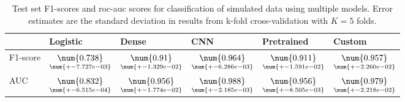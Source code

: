 \begin{table}
\centering
\caption{
Test set F1-scores and roc-auc scores for classification of simulated data using multiple models. 
Error estimates are the standard deviation in results from k-fold cross-validation 
with $K=5$ folds.
}
\label{tab:classification-simulated-f1-auc}
\begin{tabular}{llllll}
\toprule
{} &                                            Logistic &                                               Dense &                                                 CNN &                                          Pretrained &                                              Custom \\
\midrule
F1-score &  $\underset{\num{+- 7.727e-03 }  }{\num{ 0.738 } }$ &  $\underset{\num{+- 1.329e-02 }  }{\num{ 0.91 } }$ &  $\underset{\num{+- 6.286e-03 }  }{\num{ 0.964 } }$ &  $\underset{\num{+- 1.591e-02 }  }{\num{ 0.911 } }$ &  $\underset{\num{+- 2.260e-02 }  }{\num{ 0.957 } }$ \\
AUC      &  $\underset{\num{+- 6.515e-04 }  }{\num{ 0.832 } }$ &  $\underset{\num{+- 1.774e-02 }  }{\num{ 0.956 } }$ &  $\underset{\num{+- 2.185e-03 }  }{\num{ 0.988 } }$ &  $\underset{\num{+- 8.505e-03 }  }{\num{ 0.956 } }$ &  $\underset{\num{+- 2.218e-02 }  }{\num{ 0.979 } }$ \\
\bottomrule
\end{tabular}
\end{table}
